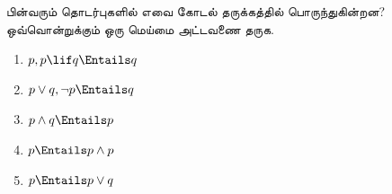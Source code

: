 \documentclass[../../../include/open-logic-section]{subfiles}
\begin{document}
\begin{prob}
  பின்வரும் தொடர்புகளில் எவை கோடல் தருக்கத்தில் பொருந்துகின்றன? ஒவ்வொன்றுக்கும்
  ஒரு மெய்மை அட்டவணை தருக.
  \begin{enumerate}
    \item $p, p \lif q \Entails q$
    \item $p \lor q, \lnot p \Entails q$
    \item $p \land q \Entails p$
    \item $p \Entails p \land p$
    \item $p \Entails p \lor q$
  \end{enumerate}
\end{prob}
\end{document}

